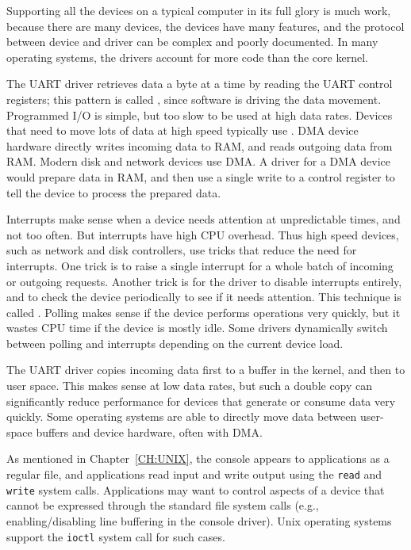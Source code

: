 Supporting all the devices on a typical computer in its full glory is
much work, because there are many devices, the devices have many
features, and the protocol between device and driver can be complex
and poorly documented. In many operating systems, the drivers account
for more code than the core kernel.

The UART driver retrieves data a byte at a time by reading the UART
control registers; this pattern is called , since
software is driving the data movement. Programmed I/O is simple, but
too slow to be used at high data rates. Devices that need to move lots
of data at high speed typically use .
DMA device hardware directly writes incoming data to RAM, and reads
outgoing data from RAM. Modern disk and network devices use DMA. A
driver for a DMA device would prepare data in RAM, and then use a
single write to a control register to tell the device to process the
prepared data.

Interrupts make sense when a device needs attention at unpredictable
times, and not too often. But interrupts have high CPU overhead. Thus
high speed devices, such as network and disk controllers, use tricks
that reduce the need for interrupts. One trick is to raise a single
interrupt for a whole batch of incoming or outgoing requests. Another
trick is for the driver to disable interrupts entirely, and to check
the device periodically to see if it needs attention. This technique
is called . Polling makes sense if the device performs
operations very quickly, but it wastes CPU time if the device is mostly
idle. Some drivers dynamically switch between polling and interrupts
depending on the current device load.

The UART driver copies incoming data first to a buffer in the kernel,
and then to user space. This makes sense at low data rates, but such a
double copy can significantly reduce performance for devices that
generate or consume data very quickly. Some operating systems are able
to directly move data between user-space buffers and device hardware,
often with DMA.

As mentioned in Chapter~\ref{CH:UNIX}, the console appears to
applications as a regular file, and applications read input and write
output using the \lstinline{read} and \lstinline{write} system calls.
Applications may want to control aspects of a device that cannot be
expressed through the standard file system calls (e.g.,
enabling/disabling line buffering in the console driver).  Unix
operating systems support the \lstinline{ioctl} system call for such
cases.

